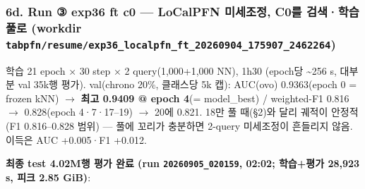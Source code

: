 \subsubsection{6d. Run ③ exp36 ft c0 — LoCalPFN 미세조정, C0를 검색·학습 풀로 (workdir \texttt{tabpfn/\allowbreak{}\allowbreak{}r\allowbreak{}esume/\allowbreak{}\allowbreak{}ex\allowbreak{}p36\_\allowbreak{}\allowbreak{}loca\allowbreak{}lpfn\_\allowbreak{}\allowbreak{}ft\_\allowbreak{}\allowbreak{}20260904\allowbreak{}\_\allowbreak{}\allowbreak{}175907\_\allowbreak{}\allowbreak{}2462264})}
\par\noindent \textbullet\enspace 학습 21 epoch × 30 step × 2 query(1,000+\allowbreak{}1,000 NN), 1h30 (epoch당 \textasciitilde{}256 s, 대부분 val 35k행 평가). val(chrono 20\%, 클래스당 5k 캡): AUC(ovo) 0.9363(epoch 0 =\allowbreak{} frozen kNN)  \ensuremath{\rightarrow}  \textbf{최고 0.9409 @ epoch 4}(=\allowbreak{} model\_\allowbreak{}best) /\allowbreak{} weighted-F1 0.816  \ensuremath{\rightarrow}  0.828(epoch 4·7·17–19)  \ensuremath{\rightarrow}  20에 0.821. 18만 풀 때(§2)와 달리 궤적이 안정적(F1 0.816–0.828 범위) — 풀에 꼬리가 충분하면 2-query 미세조정이 흔들리지 않음. 이득은 AUC +\allowbreak{}0.005·F1 +\allowbreak{}0.012.


\par\noindent \textbullet\enspace \textbf{최종 test 4.02M행 평가 완료 (run \texttt{20260905\allowbreak{}\_\allowbreak{}\allowbreak{}020159}, 02:02; 학습+\allowbreak{}평가 28,923 s, 피크 2.85 GiB)}:


